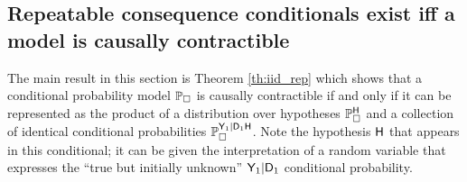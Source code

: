 






\subsection{Repeatable consequence conditionals exist iff a model is causally contractible}

The main result in this section is Theorem \ref{th:iid_rep} which shows that a conditional probability model $\mathbb{P}_\square$ is causally contractible if and only if it can be represented as the product of a distribution over hypotheses $\mathbb{P}_\square^{\mathsf{H}}$ and a collection of identical conditional probabilities $\mathbb{P}_\square^{\mathsf{Y}_1|\mathsf{D}_1\mathsf{H}}$. Note the hypothesis $\mathsf{H}$ that appears in this conditional; it can be given the interpretation of a random variable that expresses the ``true but initially unknown'' $\mathsf{Y}_1|\mathsf{D}_1$ conditional probability.

